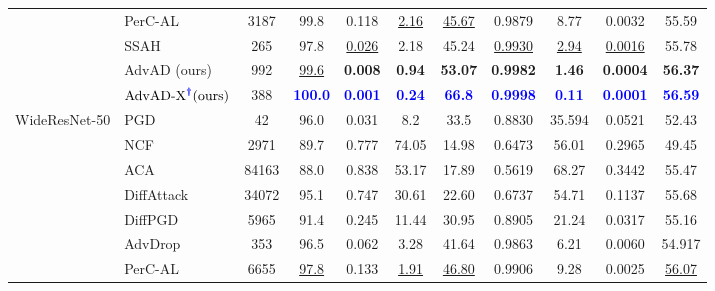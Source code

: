 \documentclass{article}
\begin{document}
\begin{table}[!h]
{\begin{tabular}{cp{2.2cm}ccccccccc}
                                    & PerC-AL       & 3187   & 99.8     & 0.118     & \underline{2.16}      & \underline{45.67}     & 0.9879   & 8.77    & 0.0032   & 55.59 \\
                                    & SSAH  & 265    & 97.8     & \underline{0.026}     & 2.18      & 45.24     & \underline{0.9930}   & \underline{2.94}    & \underline{0.0016}   & 55.78 \\
                                     \cmidrule(lr){2-11}
                                    & AdvAD (ours)       & {992}    & \underline{99.6}     & \textbf{0.008}     & \textbf{0.94}      & \textbf{53.07}     & \textbf{0.9982}   & \textbf{1.46}    & \textbf{0.0004}   & \textbf{56.37} \\
                                    & $\text{AdvAD-X}^{\textcolor{blue}{\boldsymbol{\dag}}} \text{(ours)}$ & {388}  & \textcolor{blue}{\textbf{100.0}}   & \textcolor{blue}{\textbf{0.001}}   & \textcolor{blue}{\textbf{0.24}}    & \textcolor{blue}{\textbf{66.8}}    & \textcolor{blue}{\textbf{0.9998}}   & \textcolor{blue}{\textbf{0.11}}    & \textcolor{blue}{\textbf{0.0001}}   & \textcolor{blue}{\textbf{56.59}} \\
        \bottomrule
           \multirow{10}{*}{WideResNet-50}  
                                    & PGD           & 42     & {96.0}     & {0.031}     & {8.2}       & 33.5      & 0.8830   & 35.594    & 0.0521   & 52.43 \\
                                    & NCF           & 2971  & 89.7     & 0.777     & 74.05     & 14.98     & 0.6473   & 56.01   & 0.2965   & 49.45 \\
                                    & ACA     & 84163  & 88.0     & 0.838     & 53.17     & 17.89     & 0.5619   & 68.27   & 0.3442   & 55.47 \\
                                    & DiffAttack    & 34072  & 95.1     & 0.747     & 30.61     & 22.60     & 0.6737   & 54.71   & 0.1137   & 55.68 \\
                                    & DiffPGD & 5965   & 91.4     & {0.245}     & {11.44}     & 30.95     & 0.8905   & 21.24   & {0.0317}   & 55.16 \\
                                    & AdvDrop       & 353    & {96.5}     & 0.062     & 3.28      & {41.64}     & {0.9863}   & {6.21}    & {0.0060}   & 54.917 \\
                                    & PerC-AL       & 6655   & \underline{97.8}     & {0.133}     & \underline{1.91}      & \underline{46.80}     & {0.9906}   & 9.28    & {0.0025}   & \underline{56.07} \\

\end{tabular}}
\end{table}
\end{document}
